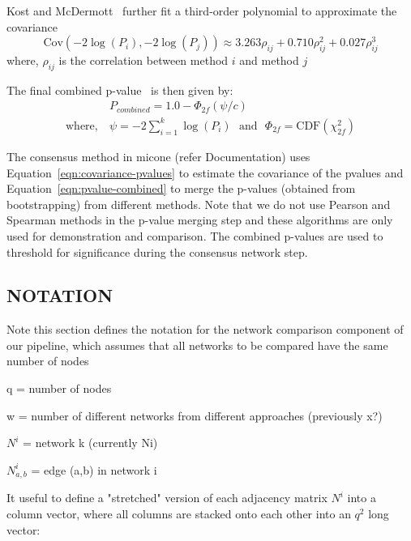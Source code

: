  Kost and McDermott~\cite{kost_combining_2002} further fit a third-order polynomial to approximate the covariance
  \begin{equation}
    \mathrm{Cov}\left( -2\log(P_i), -2\log(P_j) \right) \approx 3.263 \rho_{ij} + 0.710 \rho_{ij}^2 + 0.027 \rho_{ij}^3
    \label{eqn:covariance-pvalues}
  \end{equation}
  where, $\rho_{ij}$ is the correlation between method $i$ and method $j$

  The final combined p-value~\cite{Poole_Gibbs_Shmulevich_Bernard_Knijnenburg_2016} is then given by:
  \begin{equation}
    \begin{aligned}
        & P_{combined} = 1.0 - \Phi_{2f}\left( \psi / c \right) \\
        \text{where},~ &\psi = -2 \sum_{i=1}^k \log(P_i) ~~~\text{and}~~~ \Phi_{2f} = \mathrm{CDF}\left( \chi^2_{2f} \right)
    \end{aligned}
    \label{eqn:pvalue-combined}
  \end{equation}

  The consensus method in \ac{micone} (refer Documentation) uses Equation~\ref{eqn:covariance-pvalues} to estimate the covariance of the pvalues and Equation~\ref{eqn:pvalue-combined} to merge the p-values (obtained from bootstrapping) from different methods.
  Note that we do not use Pearson and Spearman methods in the p-value merging step and these algorithms are only used for demonstration and comparison.
  The combined p-values are used to threshold for significance during the consensus network step.

 \subsection*{NOTATION}

Note this section defines the notation for the network comparison component of our pipeline, which assumes that all networks to be compared have the same number of nodes

q = number of nodes

w = number of different networks from different approaches (previously x?)

$N^i$ = network k (currently Ni)

$N^i_{a,b}$ = edge (a,b) in network i

It useful to define a "stretched" version of each adjacency matrix $N^i$ into a column vector, where all columns are stacked onto each other into an $q^2$ long vector:

